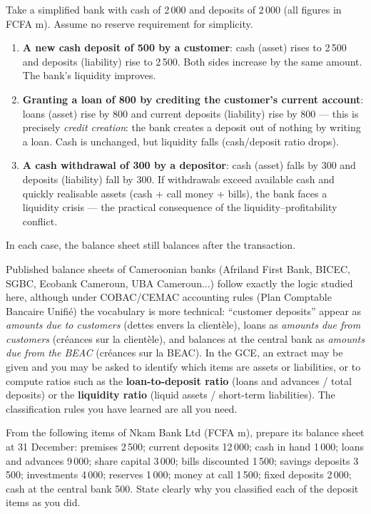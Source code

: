 \documentclass[11pt]{article}
\begin{document}
\begin{exemplebox}
Take a simplified bank with cash of 2\,000 and deposits of 2\,000 (all figures in FCFA m). Assume no reserve requirement for simplicity.
\begin{enumerate}
\item \textbf{A new cash deposit of 500 by a customer}: cash (asset) rises to 2\,500 and deposits (liability) rise to 2\,500. Both sides increase by the same amount. The bank's liquidity improves.
\item \textbf{Granting a loan of 800 by crediting the customer's current account}: loans (asset) rise by 800 and current deposits (liability) rise by 800 — this is precisely \emph{credit creation}: the bank creates a deposit out of nothing by writing a loan. Cash is unchanged, but liquidity falls (cash/deposit ratio drops).
\item \textbf{A cash withdrawal of 300 by a depositor}: cash (asset) falls by 300 and deposits (liability) fall by 300. If withdrawals exceed available cash and quickly realisable assets (cash + call money + bills), the bank faces a liquidity crisis — the practical consequence of the liquidity--profitability conflict.
\end{enumerate}
In each case, the balance sheet still balances after the transaction.
\end{exemplebox}

\begin{savaistu}
Published balance sheets of Cameroonian banks (Afriland First Bank, BICEC, SGBC, Ecobank Cameroun, UBA Cameroun...) follow exactly the logic studied here, although under COBAC/CEMAC accounting rules (Plan Comptable Bancaire Unifié) the vocabulary is more technical: ``customer deposits'' appear as \emph{amounts due to customers} (dettes envers la clientèle), loans as \emph{amounts due from customers} (créances sur la clientèle), and balances at the central bank as \emph{amounts due from the BEAC} (créances sur la BEAC). In the GCE, an extract may be given and you may be asked to identify which items are assets or liabilities, or to compute ratios such as the \textbf{loan-to-deposit ratio} (loans and advances / total deposits) or the \textbf{liquidity ratio} (liquid assets / short-term liabilities). The classification rules you have learned are all you need.
\end{savaistu}

\begin{exercice}
From the following items of Nkam Bank Ltd (FCFA m), prepare its balance sheet at 31 December: premises 2\,500; current deposits 12\,000; cash in hand 1\,000; loans and advances 9\,000; share capital 3\,000; bills discounted 1\,500; savings deposits 3\,500; investments 4\,000; reserves 1\,000; money at call 1\,500; fixed deposits 2\,000; cash at the central bank 500. State clearly why you classified each of the deposit items as you did.
\end{exercice}
\end{document}
